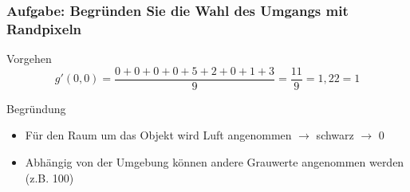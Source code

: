 \documentclass[aspectratio=169]{beamer}
\begin{document}
\begin{frame}
\begin{columns}
\begin{column}{0.5\textwidth}
\begin{alertblock}
    \end{alertblock}
    \end{column}
    \end{columns}
\end{frame}

\begin{frame}
    \frametitle{Aufgabe: Begründen Sie die Wahl des Umgangs mit Randpixeln}
    \begin{alertblock}
        {Vorgehen}
        \begin{equation}
            g'(0,0) = \frac{0+0+0+0+5+2+0+1+3}{9} = \frac{11}{9} = 1,22 = 1
        \end{equation}
    \end{alertblock}
    \begin{alertblock}
        {Begründung}
        \begin{itemize}
            \item Für den Raum um das Objekt wird Luft angenommen $\rightarrow$ schwarz $\rightarrow$ 0
            \item Abhängig von der Umgebung können andere Grauwerte angenommen werden (z.B. 100)
        \end{itemize}
    \end{alertblock}
\end{frame}
\end{document}
